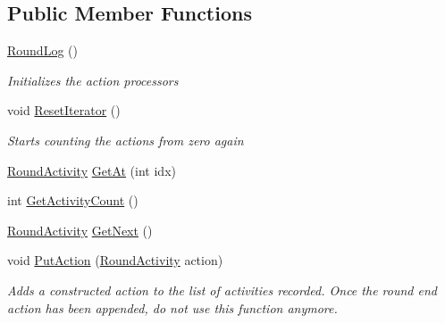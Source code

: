 \subsection*{Public Member Functions}
\begin{DoxyCompactItemize}
\item 
\hypertarget{class_m_b_c_1_1_core_1_1_round_log_a50d3d5c41078aa520500ca86dd5694ab}{\hyperlink{class_m_b_c_1_1_core_1_1_round_log_a50d3d5c41078aa520500ca86dd5694ab}{Round\-Log} ()}\label{class_m_b_c_1_1_core_1_1_round_log_a50d3d5c41078aa520500ca86dd5694ab}

\begin{DoxyCompactList}\small\item\em Initializes the action processors\end{DoxyCompactList}\item 
\hypertarget{class_m_b_c_1_1_core_1_1_round_log_ad5114bea3e605c3587033cc4b9db6aa7}{void \hyperlink{class_m_b_c_1_1_core_1_1_round_log_ad5114bea3e605c3587033cc4b9db6aa7}{Reset\-Iterator} ()}\label{class_m_b_c_1_1_core_1_1_round_log_ad5114bea3e605c3587033cc4b9db6aa7}

\begin{DoxyCompactList}\small\item\em Starts counting the actions from zero again\end{DoxyCompactList}\item 
\hyperlink{class_m_b_c_1_1_core_1_1_round_log_1_1_round_activity}{Round\-Activity} \hyperlink{class_m_b_c_1_1_core_1_1_round_log_a14deb5b327e8c77d3535e342701711d9}{Get\-At} (int idx)
\item 
int \hyperlink{class_m_b_c_1_1_core_1_1_round_log_a389bd537cf73c73998e0a789961d7536}{Get\-Activity\-Count} ()
\item 
\hyperlink{class_m_b_c_1_1_core_1_1_round_log_1_1_round_activity}{Round\-Activity} \hyperlink{class_m_b_c_1_1_core_1_1_round_log_a02c4c7d407ff609478505d28ff20f884}{Get\-Next} ()
\item 
\hypertarget{class_m_b_c_1_1_core_1_1_round_log_a0bb405409acf2b889d714bbff68abc94}{void \hyperlink{class_m_b_c_1_1_core_1_1_round_log_a0bb405409acf2b889d714bbff68abc94}{Put\-Action} (\hyperlink{class_m_b_c_1_1_core_1_1_round_log_1_1_round_activity}{Round\-Activity} action)}\label{class_m_b_c_1_1_core_1_1_round_log_a0bb405409acf2b889d714bbff68abc94}

\begin{DoxyCompactList}\small\item\em Adds a constructed action to the list of activities recorded. Once the round end action has been appended, do not use this function anymore.\end{DoxyCompactList}\end{DoxyCompactItemize}


